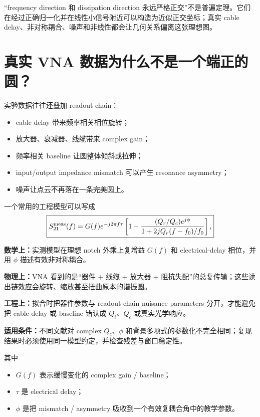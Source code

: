 \documentclass[11pt,a4paper,openany]{ctexrep}
\newcommand{\formulaexplain}[4]{%
\begin{formulaguidebox}
\textbf{\color{KidBlue}数学上：}#1\par
\textbf{\color{KidTeal}物理上：}#2\par
\textbf{\color{KidGold!55!black}工程上：}#3\par
\textbf{\color{KidRed}适用条件：}#4
\end{formulaguidebox}%
}
\begin{document}
\begin{center}
\end{center}

\begin{mistakebox}
“frequency direction 和 dissipation direction 永远严格正交”不是普遍定理。它们在经过正确归一化并在线性小信号附近可以构造为近似正交坐标；真实 cable delay、非对称耦合、噪声和非线性都会让几何关系偏离这张理想图。
\end{mistakebox}

\section{真实 VNA 数据为什么不是一个端正的圆？}

实验数据往往还叠加 readout chain：
\begin{itemize}
  \item cable delay 带来频率相关相位旋转；
  \item 放大器、衰减器、线缆带来 complex gain；
  \item 频率相关 baseline 让圆整体倾斜或拉伸；
  \item input/output impedance mismatch 可以产生 resonance asymmetry；
  \item 噪声让点云不再落在一条完美圆上。
\end{itemize}

一个常用的工程模型可以写成
\[
\boxed{
S_{21}^{\rm meas}(f)
=
G(f)e^{-j2\pi f\tau}
\left[
1-
\frac{(Q_r/Q_c)e^{j\phi}}
{1+2jQ_r(f-f_0)/f_0}
\right],
}
\]
\formulaexplain
{实测模型在理想 notch 外乘上复增益 $G(f)$ 和 electrical-delay 相位，并用 $\phi$ 描述有效非对称耦合。}
{VNA 看到的是“器件 + 线缆 + 放大器 + 阻抗失配”的总复传输；这些读出链效应会旋转、缩放甚至扭曲原本的谐振圆。}
{拟合时把器件参数与 readout-chain nuisance parameters 分开，才能避免把 cable delay 或 baseline 错认成 $Q_i$、$Q_c$ 或真实光学响应。}
{不同文献对 complex $Q_c$、$\phi$ 和背景多项式的参数化不完全相同；复现结果时必须使用同一模型约定，并检查残差与窗口稳定性。}
其中
\begin{itemize}
  \item $G(f)$ 表示缓慢变化的 complex gain / baseline；
  \item $\tau$ 是 electrical delay；
  \item $\phi$ 是把 mismatch / asymmetry 吸收到一个有效复耦合角中的教学参数。
\end{itemize}
\end{document}
